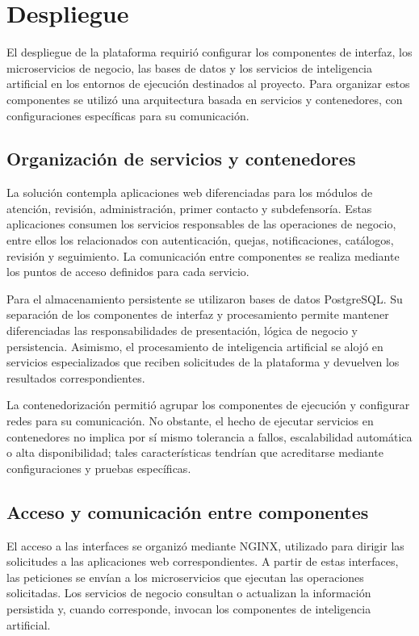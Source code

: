 \section{Despliegue}
\label{sec:despliegue}

El despliegue de la plataforma requirió configurar los componentes de interfaz, los microservicios de negocio, las bases de datos y los servicios de inteligencia artificial en los entornos de ejecución destinados al proyecto. Para organizar estos componentes se utilizó una arquitectura basada en servicios y contenedores, con configuraciones específicas para su comunicación.

\subsection{Organización de servicios y contenedores}
\label{subsec:despliegue_contenedores}

La solución contempla aplicaciones web diferenciadas para los módulos de atención, revisión, administración, primer contacto y subdefensoría. Estas aplicaciones consumen los servicios responsables de las operaciones de negocio, entre ellos los relacionados con autenticación, quejas, notificaciones, catálogos, revisión y seguimiento. La comunicación entre componentes se realiza mediante los puntos de acceso definidos para cada servicio.

Para el almacenamiento persistente se utilizaron bases de datos PostgreSQL. Su separación de los componentes de interfaz y procesamiento permite mantener diferenciadas las responsabilidades de presentación, lógica de negocio y persistencia. Asimismo, el procesamiento de inteligencia artificial se alojó en servicios especializados que reciben solicitudes de la plataforma y devuelven los resultados correspondientes.

La contenedorización permitió agrupar los componentes de ejecución y configurar redes para su comunicación. No obstante, el hecho de ejecutar servicios en contenedores no implica por sí mismo tolerancia a fallos, escalabilidad automática o alta disponibilidad; tales características tendrían que acreditarse mediante configuraciones y pruebas específicas.

\subsection{Acceso y comunicación entre componentes}
\label{subsec:despliegue_comunicacion}

El acceso a las interfaces se organizó mediante NGINX, utilizado para dirigir las solicitudes a las aplicaciones web correspondientes. A partir de estas interfaces, las peticiones se envían a los microservicios que ejecutan las operaciones solicitadas. Los servicios de negocio consultan o actualizan la información persistida y, cuando corresponde, invocan los componentes de inteligencia artificial.

